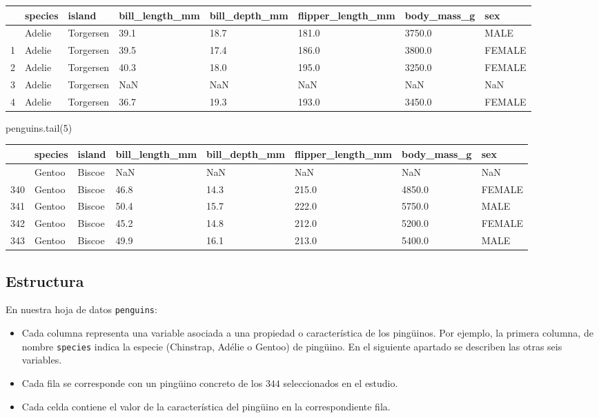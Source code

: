 \documentclass[
  a4paper,
  noprof,
  12pt,
  notoc,
  nosols,
  nobib]{mnye}
\newenvironment{Shaded}{\begin{snugshade}}{\end{snugshade}}
\newcommand{\DecValTok}[1]{\textcolor[rgb]{0.68,0.00,0.00}{#1}}
\newcommand{\NormalTok}[1]{\textcolor[rgb]{0.00,0.23,0.31}{#1}}
\theoremstyle{definition}
\theoremstyle{remark}
\begin{document}
\begin{longtable}[]{@{}llllllll@{}}
\toprule\noalign{}
& species & island & bill\_length\_mm & bill\_depth\_mm &
flipper\_length\_mm & body\_mass\_g & sex \\
\midrule\noalign{}
\endhead
\bottomrule\noalign{}
\endlastfoot
0 & Adelie & Torgersen & 39.1 & 18.7 & 181.0 & 3750.0 & MALE \\
1 & Adelie & Torgersen & 39.5 & 17.4 & 186.0 & 3800.0 & FEMALE \\
2 & Adelie & Torgersen & 40.3 & 18.0 & 195.0 & 3250.0 & FEMALE \\
3 & Adelie & Torgersen & NaN & NaN & NaN & NaN & NaN \\
4 & Adelie & Torgersen & 36.7 & 19.3 & 193.0 & 3450.0 & FEMALE \\
\end{longtable}

\begin{Shaded}
\begin{Highlighting}[]
\NormalTok{penguins.tail(}\DecValTok{5}\NormalTok{)}
\end{Highlighting}
\end{Shaded}

\begin{longtable}[]{@{}llllllll@{}}
\toprule\noalign{}
& species & island & bill\_length\_mm & bill\_depth\_mm &
flipper\_length\_mm & body\_mass\_g & sex \\
\midrule\noalign{}
\endhead
\bottomrule\noalign{}
\endlastfoot
339 & Gentoo & Biscoe & NaN & NaN & NaN & NaN & NaN \\
340 & Gentoo & Biscoe & 46.8 & 14.3 & 215.0 & 4850.0 & FEMALE \\
341 & Gentoo & Biscoe & 50.4 & 15.7 & 222.0 & 5750.0 & MALE \\
342 & Gentoo & Biscoe & 45.2 & 14.8 & 212.0 & 5200.0 & FEMALE \\
343 & Gentoo & Biscoe & 49.9 & 16.1 & 213.0 & 5400.0 & MALE \\
\end{longtable}

\subsection{Estructura}\label{estructura}

En nuestra hoja de datos \texttt{penguins}:

\begin{itemize}
\item
  Cada columna representa una variable asociada a una propiedad o
  característica de los pingüinos. Por ejemplo, la primera columna, de
  nombre \texttt{species} indica la especie (Chinstrap, Adélie o Gentoo)
  de pingüino. En el siguiente apartado se describen las otras seis
  variables.
\item
  Cada fila se corresponde con un pingüino concreto de los \(344\)
  seleccionados en el estudio.
\item
  Cada celda contiene el valor de la característica del pingüino en la
  correspondiente fila.
\end{itemize}
\end{document}
